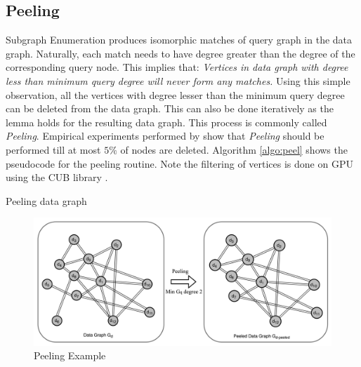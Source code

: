 \subsection{Peeling}\label{peeling}
Subgraph Enumeration produces isomorphic matches of query graph in the data graph.
Naturally, each match needs to have degree greater than the degree of the corresponding query node.
This implies that: \textit{Vertices in data graph with degree less than minimum query degree will never form any matches.}
Using this simple observation, all the vertices with degree lesser than the minimum query degree can be deleted from the data graph.
This can also be done iteratively as the lemma holds for the resulting data graph.
This process is commonly called \textit{Peeling}.
Empirical experiments performed by \cite{PARSEC_VD} show that \textit{Peeling} should be performed till at most $5\%$ of nodes are deleted.
Algorithm \ref{algo:peel} shows the pseudocode for the peeling routine.
Note the filtering of vertices is done on GPU using the CUB library \cite{cub}.
\begin{algorithm}[h]
    \caption{Peeling data graph}
    \label{algo:peel}


\end{algorithm}
\begin{figure}
    \includegraphics[width=\textwidth]{fig/LR/peeling.png}
    \caption{Peeling Example}
    \label{fig:peeling}
\end{figure}

